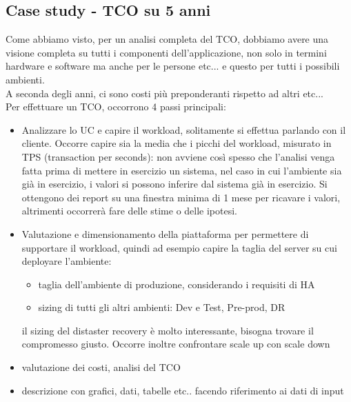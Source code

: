 \documentclass{article}
\begin{document}
\subsection{Case study - TCO su 5 anni}
Come abbiamo visto, per un analisi completa del TCO, dobbiamo avere una visione completa su tutti i componenti dell'applicazione, non solo in termini hardware e software ma anche per le persone etc... e questo per tutti i possibili ambienti.\\ A seconda degli anni, ci sono costi più preponderanti rispetto ad altri etc...\\ Per effettuare un TCO, occorrono 4 passi principali:
\begin{itemize}
\item Analizzare lo UC e capire il workload, solitamente si effettua parlando con il cliente. Occorre capire sia la media che i picchi del workload, misurato in TPS (transaction per seconds): non avviene così spesso che l'analisi venga fatta prima di mettere in esercizio un sistema, nel caso in cui l'ambiente sia già in esercizio, i valori si possono inferire dal sistema già in esercizio. Si ottengono dei report su una finestra minima di 1 mese per ricavare i valori, altrimenti occorrerà fare delle stime o delle ipotesi.
\item Valutazione e dimensionamento della piattaforma per permettere di supportare il workload, quindi ad esempio capire la taglia del server su cui deployare l'ambiente:
\begin{itemize}
\item taglia dell'ambiente di produzione, considerando i requisiti di HA
\item sizing di tutti gli altri ambienti: Dev e Test, Pre-prod, DR
\end{itemize}
il sizing del distaster recovery è molto interessante, bisogna trovare il compromesso giusto. Occorre inoltre confrontare scale up con scale down
\item valutazione dei costi, analisi del TCO
\item descrizione con grafici, dati, tabelle etc.. facendo riferimento ai dati di input
\end{itemize}
\end{document}
